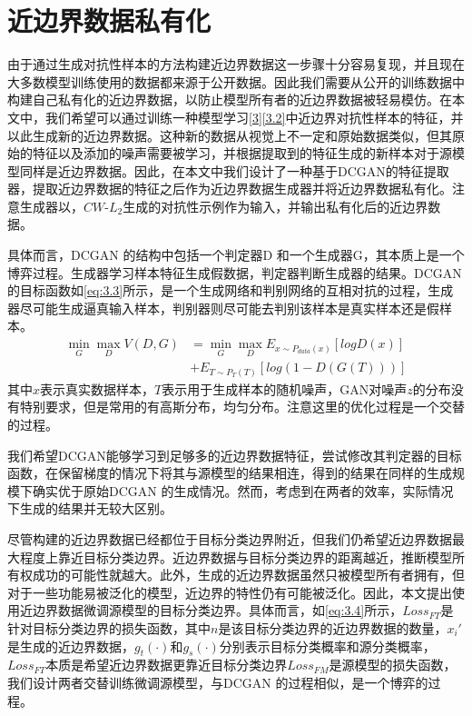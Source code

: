 \section{近边界数据私有化}\label{3.3}

由于通过生成对抗性样本的方法构建近边界数据这一步骤十分容易复现，并且现在大多数模型训练使用的数据都来源于公开数据。因此我们需要从公开的训练数据中构建自己私有化的近边界数据，以防止模型所有者的近边界数据被轻易模仿。在本文中，我们希望可以通过训练一种模型学习\ref{3}\ref{3.2}中近边界对抗性样本的特征，并以此生成新的近边界数据。这种新的数据从视觉上不一定和原始数据类似，但其原始的特征以及添加的噪声需要被学习，并根据提取到的特征生成的新样本对于源模型同样是近边界数据。因此，在本文中我们设计了一种基于DCGAN\cite{radford2015unsupervised}的特征提取器，提取近边界数据的特征之后作为近边界数据生成器并将近边界数据私有化。注意生成器以，$CW$-$L_2$生成的对抗性示例作为输入，并输出私有化后的近边界数据。

具体而言，DCGAN 的结构中包括一个判定器D 和一个生成器G，其本质上是一个博弈过程。生成器学习样本特征生成假数据，判定器判断生成器的结果。DCGAN 的目标函数如\ref{eq:3.3}所示，是一个生成网络和判别网络的互相对抗的过程，生成器尽可能生成逼真输入样本，判别器则尽可能去判别该样本是真实样本还是假样本。
\begin{equation}
	\label{eq:3.3}
	\begin{split}
		\mathop{min} \limits_{G} \mathop{max} \limits_{D} V(D, G) &= \mathop{min} \limits_{G} \mathop{max} \limits_{D} E_{x \sim P_{data}(x)}[logD(x)] \\
		&+ E_{T \sim P_{T}(T)}[log(1 - D(G(T)))]
	\end{split}
\end{equation}
其中$x$表示真实数据样本，$T$表示用于生成样本的随机噪声，GAN对噪声$z$的分布没有特别要求，但是常用的有高斯分布，均匀分布。注意这里的优化过程是一个交替的过程。

我们希望DCGAN能够学习到足够多的近边界数据特征，尝试修改其判定器的目标函数，在保留梯度的情况下将其与源模型的结果相连，得到的结果在同样的生成规模下确实优于原始DCGAN 的生成情况。然而，考虑到在两者的效率，实际情况下生成的结果并无较大区别。

尽管构建的近边界数据已经都位于目标分类边界附近，但我们仍希望近边界数据最大程度上靠近目标分类边界。近边界数据与目标分类边界的距离越近，推断模型所有权成功的可能性就越大。此外，生成的近边界数据虽然只被模型所有者拥有，但对于一些功能易被泛化的模型，近边界的特性仍有可能被泛化。因此，本文提出使用近边界数据微调源模型的目标分类边界。具体而言，如\ref{eq:3.4}所示，$Loss_{FT}$是针对目标分类边界的损失函数，其中$n$是该目标分类边界的近边界数据的数量，$x_i'$是生成的近边界数据，$g_t(\cdot)$和$g_s(\cdot)$分别表示目标分类概率和源分类概率，$Loss_{FT}$本质是希望近边界数据更靠近目标分类边界$Loss_{FM}$是源模型的损失函数，我们设计两者交替训练微调源模型，与DCGAN 的过程相似，是一个博弈的过程。

